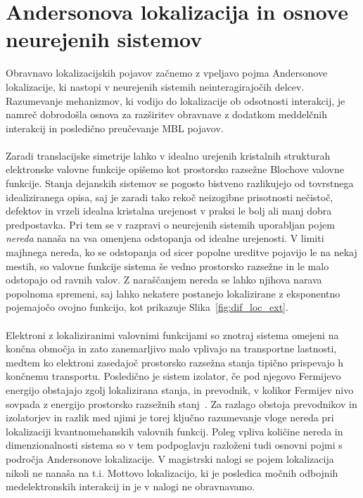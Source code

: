 \section{Andersonova lokalizacija in osnove neurejenih sistemov}
\label{anderson}
Obravnavo lokalizacijskih pojavov začnemo z vpeljavo pojma Andersonove lokalizacije, ki nastopi v neurejenih sistemih neinteragirajočih delcev. Razumevanje mehanizmov, ki vodijo do lokalizacije ob odsotnosti interakcij, je namreč dobrodošla osnova za razširitev obravnave z dodatkom meddelčnih interakcij in posledično preučevanje MBL pojavov. \\\\	
Zaradi translacijske simetrije lahko v idealno urejenih kristalnih strukturah elektronske valovne funkcije  opišemo kot prostorsko razsežne Blochove valovne funkcije. Stanja dejanskih sistemov se pogosto bistveno razlikujejo od tovrstnega idealiziranega opisa, saj je zaradi tako rekoč neizogibne prisotnosti nečistoč, defektov in vrzeli idealna kristalna urejenost v praksi le bolj ali manj dobra predpostavka. Pri tem se v razpravi o neurejenih sistemih uporabljan pojem \emph{nereda} nanaša na vsa omenjena odstopanja od idealne urejenosti.  V limiti majhnega nereda, ko se odstopanja od sicer popolne ureditve pojavijo le na nekaj mestih, so valovne funkcije sistema še vedno prostorsko razsežne in le malo odstopajo od ravnih valov. Z naraščanjem nereda se lahko njihova narava popolnoma spremeni, saj lahko nekatere  postanejo lokalizirane z eksponentno pojemajočo ovojno funkcijo, kot prikazuje Slika~\ref{fig:dif_loc_ext}. \\\\Elektroni z lokaliziranimi valovnimi funkcijami so znotraj sistema omejeni na končna območja in zato zanemarljivo malo vplivajo na transportne lastnosti, medtem ko elektroni zasedajoč prostorsko razsežna stanja tipično prispevajo h končnemu transportu. Posledično je sistem izolator, če pod njegovo Fermijevo energijo obstajajo zgolj lokalizirana stanja, in prevodnik, v kolikor Fermijev nivo sovpada z energijo prostorsko razsežnih stanj~\cite{kramer1993localization}. Za razlago obstoja prevodnikov in izolatorjev in razlik med njimi je torej ključno razumevanje vloge nereda pri lokalizaciji kvantnomehanskih valovnih funkcij. Poleg vpliva količine nereda in dimenzionalnosti sistema so v tem podpoglavju razloženi tudi osnovni pojmi s področja Andersonove lokalizacije. V magistrski nalogi se pojem lokalizacija  nikoli ne nanaša na t.i. Mottovo lokalizacijo,
ki je posledica močnih odbojnih medelektronskih interakcij in je v nalogi ne obravnavamo. \\\\

